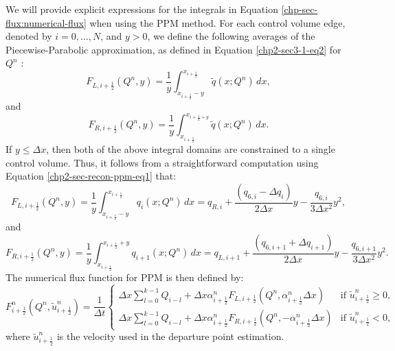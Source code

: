 We will provide explicit expressions for the integrals in Equation \eqref{chp-sec-flux:numerical-flux} 
when using the PPM method. For each control volume edge, denoted by $i=0, \ldots, N$, and $y>0$, 
we define the following averages of the Piecewise-Parabolic approximation, as defined in
Equation \eqref{chp2-sec3-1-eq2} for $Q^{n}$ \citep{colella:1984}:
\begin{equation}
	\label{chp-sec-flux:fL_1}
	F_{L,i+\frac{1}{2}}(Q^n,y) = \frac{1}{y} \int_{x_{i+\frac{1}{2}}-y}^{x_{i+\frac{1}{2}}}
	\tilde{q}(x;Q^n)\,dx,
\end{equation}
and
\begin{equation}
	\label{chp-sec-flux:fR_1}
	F_{R,i+\frac{1}{2}}(Q^n,y) = \frac{1}{y} \int_{x_{i+\frac{1}{2}}}^{x_{i+\frac{1}{2}+y}}
	\tilde{q}(x;Q^n)\,dx.
\end{equation}
If $y \leq \Delta x$, then both of the above integral domains
are constrained to a single control volume. Thus,
it follows from a straightforward computation using 
Equation \eqref{chp2-sec-recon-ppm-eq1} that:
\begin{equation}
	\label{chp-sec-flux:fL_2}
	F_{L,i+\frac{1}{2}}(Q^n,y) = \frac{1}{y} \int_{x_{i+\frac{1}{2}}-y}^{x_{i+\frac{1}{2}}}
	q_{i}(x;Q^n)\,dx = 
	q_{R,i} +\frac{(q_{6,i} - \Delta q_i)}{2\Delta x}y
	- \frac{q_{6,i}}{3\Delta x^2}y^2,
\end{equation}
and
\begin{equation}
	\label{chp-sec-flux:fR_2}
	F_{R,i+\frac{1}{2}}(Q^n,y) = \frac{1}{y} \int_{x_{i+\frac{1}{2}}}^{x_{i+\frac{1}{2}}+y}
	q_{i+1}(x;Q^n)\,dx = 
	q_{L,i+1} +\frac{(q_{6,i+1} + \Delta q_{i+1})}{2\Delta x}y
	- \frac{q_{6,i+1}}{3\Delta x^2}y^2.
\end{equation}
The numerical flux function for PPM is then defined by:
\begin{equation}
	\label{chp-sec-flux:numerical-flux2}
    F_{i+\frac{1}{2}}^n(Q^n,\tilde{u}_{i+\frac{1}{2}}^n)  =  \frac{1}{\Delta t}
    	\begin{cases}
    	\Delta x\sum_{l=0}^{k-1} Q_{i-l} +  
		\Delta x {\alpha}_{i+\frac{1}{2}}^nF_{L,i+\frac{1}{2}}(Q^n, {\alpha}_{i+\frac{1}{2}}^n\Delta x) & \text{if } \tilde{u}_{i+\frac{1}{2}}^n \geq 0,\\
    	\Delta x\sum_{l=0}^{k-1} Q_{i-l} +  
		\Delta x{\alpha}_{i+\frac{1}{2}}^nF_{R,i+\frac{1}{2}}(Q^n,-{\alpha}_{i+\frac{1}{2}}^n\Delta x) & \text{if } \tilde{u}_{i+\frac{1}{2}}^n<0,
    	\end{cases}
\end{equation}
where $\tilde{u}_{i+\frac{1}{2}}^n$ is the velocity used in the departure point estimation.

